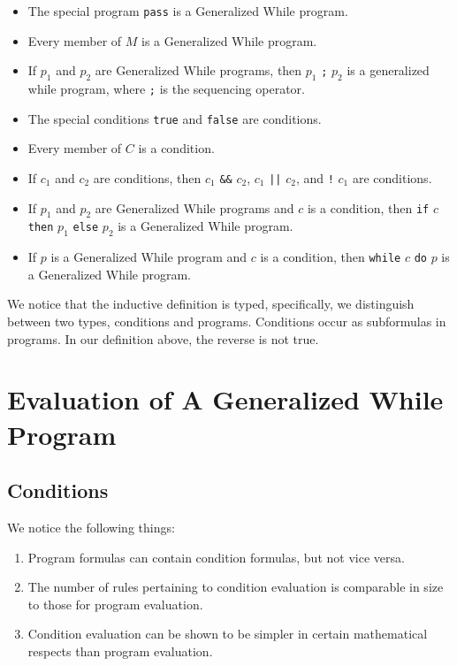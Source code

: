 \documentclass[11pt]{article}
\begin{document}
\begin{itemize}
\item The special program \texttt{pass} is a Generalized While program.
\item Every member of $M$ is a Generalized While program.
\item If $p_{1}$ and $p_{2}$ are Generalized While programs, then $p_{1}$ \texttt{;} $p_{2}$ is a generalized while program, where \texttt{;} is the sequencing operator.
\item The special conditions \texttt{true} and \texttt{false} are conditions.
\item Every member of $C$ is a condition.
\item If $c_{1}$ and $c_{2}$ are conditions, then $c_{1}$ \texttt{\&\&} $c_{2}$, $c_{1}$ \texttt{||} $c_{2}$, and \texttt{!} $c_{1}$ are conditions.
\item If $p_{1}$ and $p_{2}$ are Generalized While programs and $c$ is a condition, then \texttt{if} $c$ \texttt{then} $p_{1}$ \texttt{else} $p_{2}$ is a Generalized While program.
\item If $p$ is a Generalized While program and $c$ is a condition, then \texttt{while} $c$ \texttt{do} $p$ is a Generalized While program.
\end{itemize}

We notice that the inductive definition is typed, specifically, we distinguish between two types, conditions and programs.  Conditions occur as subformulas in programs.  In our definition above, the reverse is not true.

\section{Evaluation of A Generalized While Program}

\subsection{Conditions}

We notice the following things:
\begin{enumerate}
\item Program formulas can contain condition formulas, but not vice versa.
\item The number of rules pertaining to condition evaluation is comparable in size to those for program evaluation.
\item Condition evaluation can be shown to be simpler in certain mathematical respects than program evaluation.
\end{enumerate}
\end{document}
